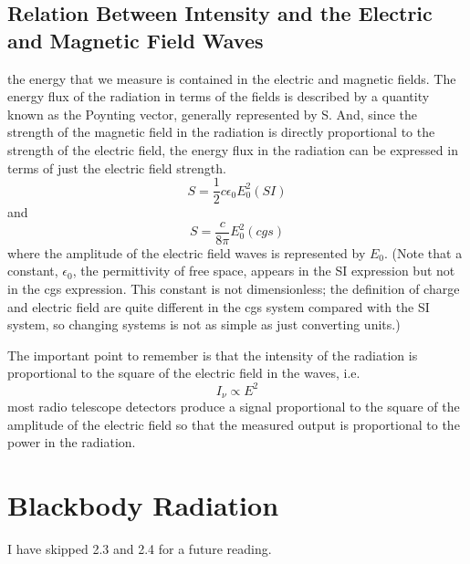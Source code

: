 \documentclass[10pt]{report}
\begin{document}
\subsection{Relation Between Intensity and the Electric and Magnetic Field Waves}
 the energy that we measure is contained in the electric and magnetic fields.  The energy flux of the radiation in terms of the fields is described by a quantity known as the Poynting vector, generally represented by S.  And, since the strength of the magnetic field in the radiation is directly proportional to the strength of the electric field, the energy flux in the radiation can be expressed in terms of just the electric field strength.
 \begin{equation}
 S=\frac{1}{2}c\epsilon_0E^2_0(SI)
 \end{equation}
 and
 \begin{equation}
 S=\frac{c}{8 \pi}E^2_0(cgs)
 \end{equation}
 where the amplitude of the electric field waves is represented by $E_0$.  (Note that a constant, $\epsilon_0$, the permittivity of free space, appears in the SI expression but not in the cgs expression.   This constant is not dimensionless; the definition of charge and electric field are quite different in the cgs system compared with the SI system, so changing systems is not as simple as just converting units.)
 
The important point to remember is that the intensity of the radiation is proportional to the square of the electric field in the waves, i.e. 
\begin{equation}
I_\nu \propto E^2
\end{equation}
 most radio telescope detectors produce a signal proportional to the square of the amplitude of the electric field so that the measured output is proportional to the power in the radiation. 
 
\section{Blackbody Radiation}
I have skipped 2.3 and 2.4 for a future reading.
\end{document}
